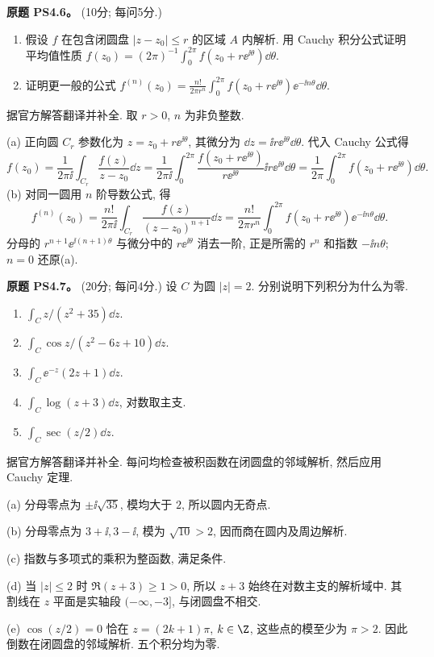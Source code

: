 \begin{exercise}\label{ass:ps4-6}
\textbf{原题 PS4.6。} (10分; 每问5分.)
\begin{enumerate}[label=(\alph*)]
\item 假设 $f$ 在包含闭圆盘 $|z-z_0|\le r$ 的区域 $A$ 内解析. 用 Cauchy 积分公式证明平均值性质
$f(z_0)=(2\pi)^{-1}\int_0^{2\pi}f(z_0+r\ee^{\ii\theta})\dd\theta$.
\item 证明更一般的公式
$f^{(n)}(z_0)=\frac{n!}{2\pi r^n}\int_0^{2\pi}
 f(z_0+r\ee^{\ii\theta})\ee^{-\ii n\theta}\dd\theta$.
\end{enumerate}
\end{exercise}
\begin{solution}
据官方解答翻译并补全. 取 $r>0$, $n$ 为非负整数.

(a) 正向圆 $C_r$ 参数化为 $z=z_0+r\ee^{\ii\theta}$, 其微分为
$\dd z=\ii r\ee^{\ii\theta}\dd\theta$. 代入 Cauchy 公式得
\[
 f(z_0)=\frac1{2\pi\ii}\int_{C_r}\frac{f(z)}{z-z_0}\dd z
 =\frac1{2\pi\ii}\int_0^{2\pi}
 \frac{f(z_0+r\ee^{\ii\theta})}{r\ee^{\ii\theta}}
 \ii r\ee^{\ii\theta}\dd\theta
 =\frac1{2\pi}\int_0^{2\pi}f(z_0+r\ee^{\ii\theta})\dd\theta.
\]
(b) 对同一圆用 $n$ 阶导数公式, 得
\[
 f^{(n)}(z_0)
 =\frac{n!}{2\pi\ii}\int_{C_r}\frac{f(z)}{(z-z_0)^{n+1}}\dd z
 =\frac{n!}{2\pi r^n}\int_0^{2\pi}
 f(z_0+r\ee^{\ii\theta})\ee^{-\ii n\theta}\dd\theta.
\]
分母的 $r^{n+1}\ee^{\ii(n+1)\theta}$ 与微分中的
$r\ee^{\ii\theta}$ 消去一阶, 正是所需的 $r^n$ 和指数 $-\ii n\theta$; $n=0$ 还原(a).
\end{solution}

\begin{exercise}\label{ass:ps4-7}
\textbf{原题 PS4.7。} (20分; 每问4分.) 设 $C$ 为圆 $|z|=2$. 分别说明下列积分为什么为零.
\begin{enumerate}[label=(\alph*)]
\item $\int_Cz/(z^2+35)\dd z$.
\item $\int_C\cos z/(z^2-6z+10)\dd z$.
\item $\int_C\ee^{-z}(2z+1)\dd z$.
\item $\int_C\log(z+3)\dd z$, 对数取主支.
\item $\int_C\sec(z/2)\dd z$.
\end{enumerate}
\end{exercise}
\begin{solution}
据官方解答翻译并补全. 每问均检查被积函数在闭圆盘的邻域解析, 然后应用 Cauchy 定理.

(a) 分母零点为 $\pm\ii\sqrt{35}$, 模均大于 $2$, 所以圆内无奇点.

(b) 分母零点为 $3+\ii,3-\ii$, 模为 $\sqrt{10}>2$, 因而商在圆内及周边解析.

(c) 指数与多项式的乘积为整函数, 满足条件.

(d) 当 $|z|\le2$ 时 $\Re(z+3)\ge1>0$, 所以 $z+3$ 始终在对数主支的解析域中.
其割线在 $z$ 平面是实轴段 $(-\infty,-3]$, 与闭圆盘不相交.

(e) $\cos(z/2)=0$ 恰在 $z=(2k+1)\pi$, $k\in\Z$, 这些点的模至少为 $\pi>2$.
因此倒数在闭圆盘的邻域解析. 五个积分均为零.
\end{solution}

